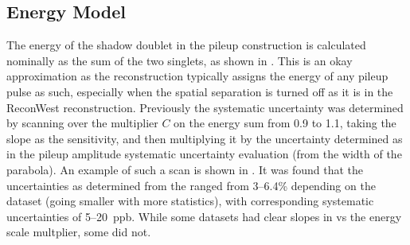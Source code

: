 




\clearpage
\subsection{Energy Model}

The energy of the shadow doublet in the pileup construction is calculated nominally as the sum of the two singlets, as shown in . This is an okay approximation as the reconstruction typically assigns the energy of any pileup pulse as such, especially when the spatial separation is turned off as it is in the ReconWest reconstruction. Previously the systematic uncertainty was determined by scanning over the multiplier $C$ on the energy sum from 0.9 to 1.1, taking the slope as the sensitivity, and then multiplying it by the uncertainty determined as in the pileup amplitude systematic uncertainty evaluation (from the width of the \chisq parabola). An example of such a scan is shown in . It was found that the uncertainties as determined from the \chisq ranged from 3--6.4\% depending on the dataset (going smaller with more statistics), with corresponding systematic uncertainties of 5--20~ppb. While some datasets had clear slopes in \R vs the energy scale multplier, some did not.




